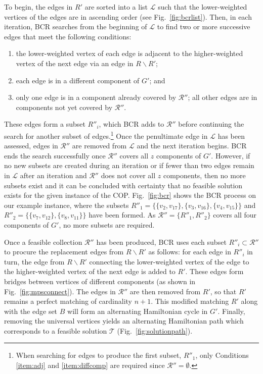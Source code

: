 \documentclass[a4paper,11pt,authoryear]{elsarticle}
\begin{document}
To begin, the edges in $R'$ are sorted into a list $\mathcal{L}$ such that the lower-weighted vertices of the edges are in ascending order (see Fig.~\ref{fig:bcrlist}). Then, in each iteration, BCR searches from the beginning of $\mathcal{L}$ to find two or more successive edges that meet the following conditions:
\begin{enumerate}[label={(\roman*)},itemsep=-0.2em]
	\item the lower-weighted vertex of each edge is adjacent to the higher-weighted vertex of the next edge via an edge in $R\backslash R'$;\label{item:adj}
	\item each edge is in a different component of $G'$; \label{item:diffcomp} and
	\item only one edge is in a component already covered by $\mathcal{R}''$; all other edges are in components not yet covered by $\mathcal{R}''$.\label{item:overlap}
\end{enumerate} 
These edges form a subset $R''_i$, which BCR adds to $\mathcal{R}''$ before continuing the search for another subset of edges.\footnote{When searching for edges to produce the first subset, $R''_1$, only Conditions \ref{item:adj} and \ref{item:diffcomp} are required since $\mathcal{R}'' = \emptyset$.} Once the penultimate edge in $\mathcal{L}$ has been assessed, edges in $\mathcal{R}''$ are removed from $\mathcal{L}$ and the next iteration begins. BCR ends the search successfully once $\mathcal{R}''$ covers all $z$ components of $G'$. However, if no new subsets are created during an iteration or if fewer than two edges remain in $\mathcal{L}$ after an iteration and $\mathcal{R}''$ does not cover all $z$ components, then no more subsets exist and it can be concluded with certainty that no feasible solution exists for the given instance of the COP. Fig.~\ref{fig:bcr} shows the BCR process on our example instance, where the subsets $R''_1 = \{\{v_2, v_{17}\},\{v_3, v_{16}\}, \{v_4, v_{15}\}\}$ and $R''_2 = \{\{v_7, v_{12}\}, \{v_8, v_{11}\}\}$ have been formed. As $\mathcal{R}'' =\{R''_1, R''_2\}$ covers all four components of $G'$, no more subsets are required.

Once a feasible collection $\mathcal{R}''$ has been produced, BCR uses each subset $R''_i \subset \mathcal{R}''$ to procure the replacement edges from $R\backslash R'$ as follows: for each edge in $R''_i$ in turn, the edge from $R \backslash R'$ connecting the lower-weighted vertex of the edge to the higher-weighted vertex of the next edge is added to $R'$. These edges form bridges between vertices of different components (as shown in Fig.~\ref{fig:mpsconnect}). The edges in $\mathcal{R}''$ are then removed from $R'$, so that $R'$ remains a perfect matching of cardinality $n+1$. This modified matching $R'$ along with the edge set $B$ will form an alternating Hamiltonian cycle in $G'$. Finally, removing the universal vertices yields an alternating Hamiltonian path which corresponds to a feasible solution $\mathcal{T}$ (Fig.~\ref{fig:solutionpath}).
\end{document}
